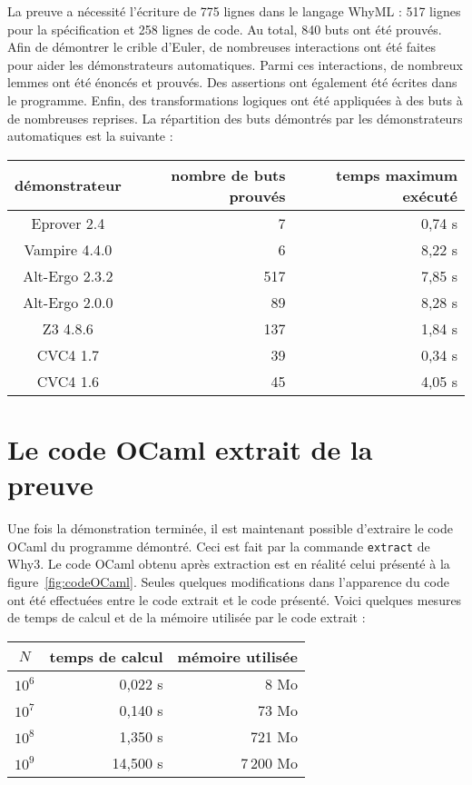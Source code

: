 \documentclass[a4paper]{easychair}
\begin{document}
La preuve a nécessité l'écriture de 775 lignes dans le langage WhyML :
517 lignes pour la spécification et 258 lignes de code.
Au total, 840 buts ont été prouvés.
Afin de démontrer le crible d'Euler, de nombreuses interactions ont été
faites pour aider les démonstrateurs automatiques.
Parmi ces interactions, de nombreux lemmes ont été énoncés et prouvés.
Des assertions ont également été écrites dans le programme.
Enfin, des transformations logiques ont  été appliquées à des buts à
de nombreuses reprises.
La répartition des buts démontrés par les démonstrateurs automatiques est la
suivante :
\begin{center}
  \begin{tabular}{|c|r|r|}
    \hline
    démonstrateur & nombre de buts prouvés & temps maximum exécuté \\
    \hline\hline
    Eprover 2.4    &     7 &      0,74 s \\\hline
    Vampire 4.4.0  &     6 &      8,22 s \\\hline
    Alt-Ergo 2.3.2 &   517 &      7,85 s \\\hline
    Alt-Ergo 2.0.0 &    89 &      8,28 s \\\hline
    Z3 4.8.6       &   137 &      1,84 s \\\hline
    CVC4 1.7       &    39 &      0,34 s \\\hline
    CVC4 1.6       &    45 &      4,05 s \\\hline
  \end{tabular}
\end{center}

\clearpage
\section{Le code OCaml extrait de la preuve}
\label{sec:extraction}

Une fois la démonstration terminée, il est maintenant possible d'extraire
le code OCaml du programme démontré. Ceci est fait par la commande
\texttt{extract} de Why3.
Le code OCaml obtenu après extraction est en réalité celui présenté
à la figure~\ref{fig:codeOCaml}.
Seules quelques modifications dans l'apparence du code ont été effectuées
entre le code extrait et le code présenté.
Voici quelques mesures de temps de calcul et de la mémoire utilisée par
le code extrait :
\begin{center}
  \begin{tabular}{|c|r|r|}
    \hline
    $N$ & temps de calcul & mémoire utilisée \\
    \hline\hline
    $10^6$ &  0,022 s &      8 Mo \\\hline
    $10^7$ &  0,140 s &     73 Mo \\\hline
    $10^8$ &  1,350 s &    721 Mo \\\hline
    $10^9$ & 14,500 s & 7\,200 Mo \\\hline
  \end{tabular}
\end{center}
\end{document}
